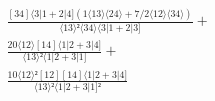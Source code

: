 \documentclass[varwidth, border=5pt]{standalone}
\begin{document}
\begin{my}
$\begin{gathered}
\scriptscriptstyle\frac{[34]⟨3|1+2|4](1⟨13⟩⟨24⟩+7/2⟨12⟩⟨34⟩)}{⟨13⟩²⟨34⟩⟨3|1+2|3]} +\\
\scriptscriptstyle\frac{20⟨12⟩[14]⟨1|2+3|4]}{⟨13⟩²⟨1|2+3|1]} +\\
\scriptscriptstyle\frac{10⟨12⟩²[12][14]⟨1|2+3|4]}{⟨13⟩²⟨1|2+3|1]²} \phantom{+}
\end{gathered}$
\end{my}
\end{document}
